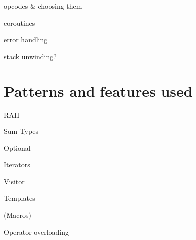             opcodes \& choosing them
            
            coroutines %
            
            error handling
            
            stack unwinding?
    
    \section{Patterns and features used}
    
        RAII
        
        Sum Types
        
        Optional
        
        Iterators
        
        Visitor
        
        Templates
        
        (Macros)
        
        Operator overloading
